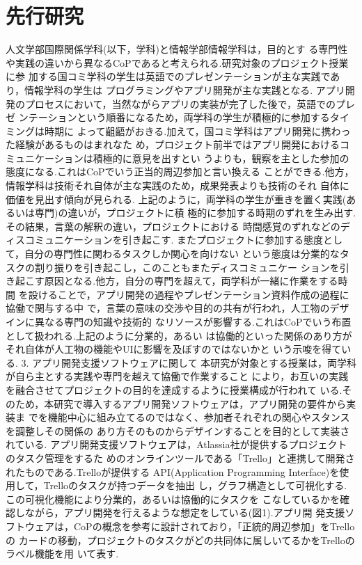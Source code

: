 \documentclass[submit,techrep]{ipsj}
\begin{document}
\section{先行研究}
\label {previousResearch}

人文学部国際関係学科(以下，学科)と情報学部情報学科は，目的とす る専門性や実践の違いから異なるCoPであると考えられる.研究対象のプロジェクト授業に参 加する国コミ学科の学生は英語でのプレゼンテーションが主な実践であり，情報学科の学生は プログラミングやアプリ開発が主な実践となる.  アプリ開発のプロセスにおいて，当然ながらアプリの実装が完了した後で，英語でのプレゼ ンテーションという順番になるため，両学科の学生が積極的に参加するタイミングは時期に よって齟齬がおきる.加えて，国コミ学科はアプリ開発に携わった経験があるものはまれなた め，プロジェクト前半ではアプリ開発におけるコミュニケーションは積極的に意見を出すとい うよりも，観察を主とした参加の態度になる.これはCoPでいう正当的周辺参加と言い換える ことができる.他方，情報学科は技術それ自体が主な実践のため，成果発表よりも技術のそれ 自体に価値を見出す傾向が見られる.  上記のように，両学科の学生が重きを置く実践(あるいは専門)の違いが，プロジェクトに積 極的に参加する時期のずれを生み出す.その結果，言葉の解釈の違い，プロジェクトにおける 時間感覚のずれなどのディスコミュニケーションを引き起こす.  またプロジェクトに参加する態度として，自分の専門性に関わるタスクしか関心を向けない という態度は分業的なタスクの割り振りを引き起こし，このこともまたディスコミュニケー ションを引き起こす原因となる.他方，自分の専門を超えて，両学科が一緒に作業をする時間 を設けることで，アプリ開発の過程やプレゼンテーション資料作成の過程に協働で関与する中 で，言葉の意味の交渉や目的の共有が行われ，人工物のデザインに異なる専門の知識や技術的 なリソースが影響する.これはCoPでいう布置として扱われる.上記のように分業的，あるい は協働的といった関係のあり方がそれ自体が人工物の機能やUIに影響を及ぼすのではないかと いう示唆を得ている.
3. アプリ開発支援ソフトウェアに関して  本研究が対象とする授業は，両学科が自ら主とする実践や専門を越えて協働で作業すること により，お互いの実践を融合させてプロジェクトの目的を達成するように授業構成が行われて いる.そのため，本研究で導入するアプリ開発ソフトウェアは，アプリ開発の要件から実装ま でを機能中心に組み立てるのではなく、参加者それぞれの関心やスタンスを調整しその関係の あり方そのものからデザインすることを目的として実装されている.
 アプリ開発支援ソフトウェアは，Atlassia社が提供するプロジェクトのタスク管理をするた めのオンラインツールである「Trello」と連携して開発されたものである.Trelloが提供する API(Application Programming Interface)を使用して，Trelloのタスクが持つデータを抽出 し，グラフ構造として可視化する.この可視化機能により分業的，あるいは協働的にタスクを こなしているかを確認しながら，アプリ開発を行えるような想定をしている(図1).アプリ開 発支援ソフトウェアは，CoPの概念を参考に設計されており，「正統的周辺参加」をTrelloの カードの移動，プロジェクトのタスクがどの共同体に属しいてるかをTrelloのラベル機能を用 いて表す.
\end{document}
